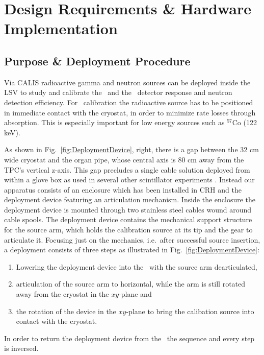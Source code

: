 \section{Design Requirements \& Hardware Implementation} \label{sec:hardware}\label{sec:design_requirements}

\subsection{Purpose \& Deployment Procedure}

Via CALIS radioactive gamma and neutron sources can be deployed inside the LSV to study and calibrate the \tpc\ and the \lsv\ detector response and neutron detection efficiency. For \tpc\ calibration the radioactive source has to be positioned in immediate contact with the cryostat, in order to minimize rate losses through absorption. This is especially important for low energy sources such as $^{57}$Co (122 keV). 

As shown in Fig.~\ref{fig:DeploymentDevice}, right, there is a gap between the 32 cm wide cryostat and the organ pipe, whose central axis is 80 cm away from the TPC's vertical z-axis. This gap precludes a single cable solution deployed from within a glove box as used in several other scintillator experiments \cite{Banks:2014hra, Huang:2013uxa}. %
Instead our apparatus consists of an enclosure which has been installed in CRH and the deployment device featuring an articulation mechanism. Inside the enclosure the deployment device is mounted through two stainless steel cables wound around cable spools. The deployment device contains the mechanical support structure for the source arm, which holds the calibration source at its tip and the gear to articulate it. Focusing just on the mechanics, i.e.~after successful source insertion, a deployment consists of three steps as illustrated in Fig.~\ref{fig:DeploymentDevice}:
\begin{enumerate}
\renewcommand{\theenumi}{\Alph{enumi}} %
\item Lowering the deployment device into the \lsv\ with the source arm dearticulated,
\item articulation of the source arm to horizontal, while the arm is still rotated away from the cryostat in the $xy$-plane and
\item the rotation of the device in the $xy$-plane to bring the calibation source into contact with the cryostat.
\end{enumerate}
In order to return the deployment device from the \lsv\ the sequence and every step is inversed.

